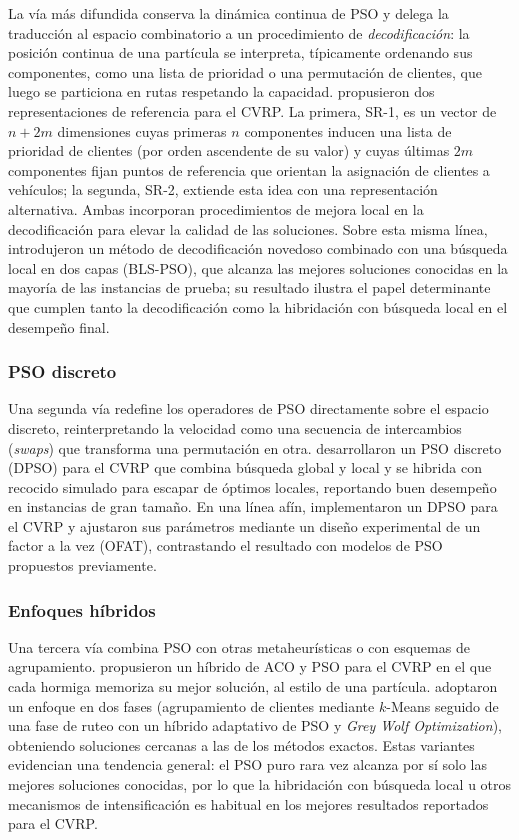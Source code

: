 La vía más difundida conserva la dinámica continua de PSO y delega la traducción al
espacio combinatorio a un procedimiento de \textit{decodificación}: la posición continua
de una partícula se interpreta, típicamente ordenando sus componentes, como una lista de
prioridad o una permutación de clientes, que luego se particiona en rutas respetando la
capacidad. \textcite{ai2009particle} propusieron dos representaciones de referencia para
el CVRP. La primera, SR-1, es un vector de $n+2m$ dimensiones cuyas primeras $n$
componentes inducen una lista de prioridad de clientes (por orden ascendente de su
valor) y cuyas últimas $2m$ componentes fijan puntos de referencia que orientan la
asignación de clientes a vehículos; la segunda, SR-2, extiende esta idea con una
representación alternativa. Ambas incorporan procedimientos de mejora local en la
decodificación para elevar la calidad de las soluciones. Sobre esta misma línea,
\textcite{ahmed2018bilayer} introdujeron un método de decodificación novedoso combinado
con una búsqueda local en dos capas (BLS-PSO), que alcanza las mejores soluciones
conocidas en la mayoría de las instancias de prueba; su resultado ilustra el papel
determinante que cumplen tanto la decodificación como la hibridación con búsqueda local
en el desempeño final.

\subsubsection{PSO discreto}

Una segunda vía redefine los operadores de PSO directamente sobre el espacio discreto,
reinterpretando la velocidad como una secuencia de intercambios (\textit{swaps}) que
transforma una permutación en otra. \textcite{chen2006hybrid} desarrollaron un PSO
discreto (DPSO) para el CVRP que combina búsqueda global y local y se hibrida con
recocido simulado para escapar de óptimos locales, reportando buen desempeño en
instancias de gran tamaño. En una línea afín, \textcite{mauliddina2020implementation}
implementaron un DPSO para el CVRP y ajustaron sus parámetros mediante un diseño
experimental de un factor a la vez (OFAT), contrastando el resultado con modelos de PSO
propuestos previamente.

\subsubsection{Enfoques híbridos}

Una tercera vía combina PSO con otras metaheurísticas o con esquemas de agrupamiento.
\textcite{kao2012hybrid} propusieron un híbrido de ACO y PSO para el CVRP en el que cada
hormiga memoriza su mejor solución, al estilo de una partícula. \textcite{son2021capacitated}
adoptaron un enfoque en dos fases (agrupamiento de clientes mediante $k$-Means seguido de
una fase de ruteo con un híbrido adaptativo de PSO y \textit{Grey Wolf Optimization}),
obteniendo soluciones cercanas a las de los métodos exactos. Estas variantes evidencian
una tendencia general: el PSO puro rara vez alcanza por sí solo las mejores soluciones
conocidas, por lo que la hibridación con búsqueda local u otros mecanismos de
intensificación es habitual en los mejores resultados reportados para el CVRP.

